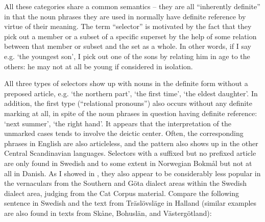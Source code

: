 All these categories share a common semantics – they are all “inherently definite” in that the noun phrases they are used in normally have definite reference by virtue of their meaning. The term “selector” is motivated by the fact that they pick out a member or a subset of a specific superset by the help of some relation between that member or subset and the set as a whole. In other words, if I say e.g.  ‘the youngest son’, I pick out one of the sons by relating him in age to the others: he may not at all be young if considered in isolation. 


All three types of selectors show up with nouns in the definite form without a preposed article, e.g.  ‘the northern part’,  ‘the first time’,  ‘the eldest daughter’. In addition, the first type (“relational pronouns”) also occurs without any definite marking at all, in spite of the noun phrases in question having definite reference:  ‘next summer’,  ‘the right hand’. It appears that the interpretation of the unmarked cases tends to involve the deictic center. Often, the corresponding phrases in English are also articleless, and the pattern also shows up in the other Central Scandinavian languages. Selectors with a suffixed but no prefixed article are only found in Swedish and to some extent in Norwegian Bokmål but not at all in Danish. As I showed in \citet{Dahl2003}, they also appear to be considerably less popular in the vernaculars from the Southern and Göta dialect areas within the Swedish dialect area, judging from the Cat Corpus material. Compare the following sentence in Swedish and the text from Träslövsläge in Halland (similar examples are also found in texts from Skåne, Bohuslän, and Västergötland):


\item 


